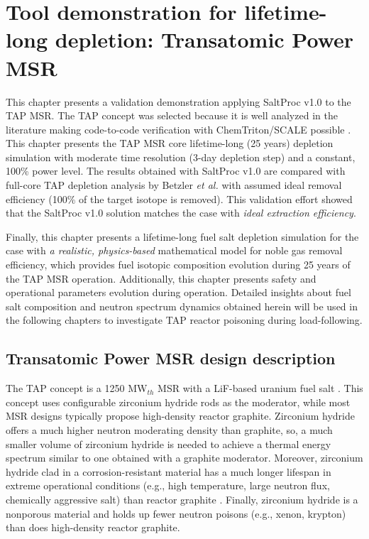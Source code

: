 \chapter{Tool demonstration for lifetime-long depletion: Transatomic Power MSR}

This chapter presents a validation demonstration applying SaltProc v1.0 to 
the \gls{TAP} \gls{MSR}. The \gls{TAP} concept was selected because it is well 
analyzed in the literature \cite{betzler_two-dimensional_2017, 
betzler_assessment_2017-1} making code-to-code verification with 
ChemTriton/SCALE possible \cite{betzler_assessment_2017-1}. This chapter 
presents the \gls{TAP} \gls{MSR} core lifetime-long (25 years) depletion 
simulation with moderate time resolution (3-day depletion step) and a 
constant, 100\% power level. The results obtained with SaltProc v1.0 are 
compared with full-core \gls{TAP} depletion analysis by Betzler \emph{et al.} 
\cite{betzler_assessment_2017-1} with assumed ideal removal efficiency (100\% 
of the target isotope is removed). This validation effort showed that the 
SaltProc v1.0 solution matches the case with \emph{ideal extraction 
efficiency}. 

Finally, this chapter presents a lifetime-long fuel salt depletion simulation 
for the case with \emph{a realistic, physics-based} mathematical model for 
noble gas removal efficiency, which provides fuel isotopic composition 
evolution during 25 years of the \gls{TAP} \gls{MSR} operation. Additionally, 
this chapter presents safety and operational parameters evolution during 
operation. Detailed 
insights about fuel salt composition and neutron spectrum dynamics obtained 
herein will be used in the following chapters to investigate \gls{TAP} 
reactor poisoning during load-following.


\section{Transatomic Power MSR design description}\label{sec:tap_design_sum}

The \gls{TAP} concept is a 1250 MW$_{th}$ \gls{MSR} with a LiF-based uranium 
fuel salt \cite{transatomic_power_corporation_technical_2016}. This concept 
uses configurable zirconium hydride rods as the moderator, while most 
\gls{MSR} designs typically propose high-density reactor graphite. Zirconium 
hydride offers a much higher neutron moderating density than graphite, so, a 
much smaller volume of zirconium hydride is needed to achieve a thermal energy 
spectrum similar to one obtained with a graphite moderator. Moreover, 
zirconium hydride clad in a corrosion-resistant material has a much longer 
lifespan in extreme operational conditions (e.g., high temperature, large 
neutron flux, chemically aggressive salt) than reactor graphite 
\cite{transatomic_power_corporation_lost_2018}. Finally, zirconium hydride is 
a nonporous material and holds up fewer neutron poisons (e.g., xenon, krypton) 
than does high-density reactor graphite.


